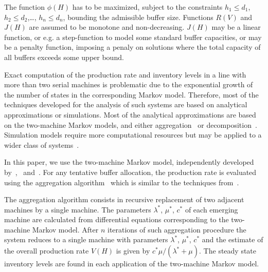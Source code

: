 \documentclass{ifacconf}
\begin{document}
The function $\phi(H)$ has to be maximized, subject to the constraints $h_1 \leq d_1$, $h_2 \leq d_2$,…, $h_n \leq d_n$, bounding the
admissible buffer size. Functions $R(V)$ and $J(H)$ are assumed to be monotone and  non-decreasing. 
$J(H)$ may be a linear function, or e.g. a step-function to model some standard buffer capacities, or  
may be a penalty function, imposing a penaly on solutions  where  the  total  capacity  of  all  buffers  exceeds  some  upper  bound. 

Exact computation of the production rate and inventory levels in a line with 
more than two serial machines is problematic due to the exponential growth of the 
number of states in the corresponding Markov model. Therefore, most of the techniques developed for the analysis of such 
systems are based on analytical approximations or simulations. Most of the analytical 
approximations are based on the two-machine Markov models, 
and either aggregation~\citep{DeKoster87} or decomposition~\citep{DalXie89,Gers87,Li2005}. 
Simulation models require more computational resources but may be applied to a wider class of systems~\citep{DS95,SorJan2004}. 
 
In this paper, we use the two-machine Markov model, independently developed 
by~\cite{LP},~\cite{DF} and~\cite{Proth84}. For 
any tentative buffer allocation, the production rate is evaluated using the
aggregation algorithm~\citep{Dolgui93} which is similar to the techniques from~\citep{TD87,DS95}. 
 
The aggregation algorithm consists in recursive 
replacement of two adjacent machines by a single machine. The parameters $\lambda^*$, $\mu^*$, $c^*$ of 
each emerging machine are calculated from differential equations corresponding to
the two-machine Markov model. After $n$ iterations of such aggregation 
procedure the system reduces to a single machine with parameters $\lambda^*$, $\mu^*$, $c^*$ and the 
estimate of the overall production rate $V(H)$ is given by $c^*\mu/(\lambda^*+\mu).$ The steady state inventory levels are found
in each application of the two-machine Markov model.
\end{document}
